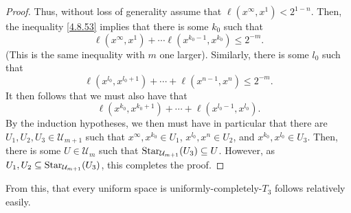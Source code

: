 \begin{thm}
\begin{savenotes}
\begin{proof}
Thus, without loss of generality assume that $\ell (x^\infty,x^1)<2^{1-n}$.  Then, the inequality \eqref{4.8.53} implies that there is some $k_0$ such that
\begin{equation}
\ell (x^\infty,x^1)+\cdots \ell (x^{k_0-1},x^{k_0})\leq 2^{-m}.
\end{equation}
(This is the same inequality with $m$ one larger).  Similarly, there is some $l_0$ such that
\begin{equation}
\ell (x^{l_0},x^{l_0+1})+\cdots +\ell (x^{n-1},x^n)\leq 2^{-m}.
\end{equation}
It then follows that we must also have that
\begin{equation}
\ell (x^{k_0},x^{k_0+1})+\cdots +\ell (x^{l_0-1},x^{l_0}).
\end{equation}
By the induction hypotheses, we then must have in particular that there are $U_1,U_2,U_3\in \mathcal{U}_{m+1}$ such that $x^\infty,x^{k_0}\in U_1$, $x^{l_0},x^n\in U_2$, and $x^{k_0},x^{l_0}\in U_3$.  Then, there is some $U\in \mathcal{U}_m$ such that $\operatorname{Star} _{\mathcal{U}_{m+1}}(U_3)\subseteq U$.  However, as $U_1,U_2\subseteq \operatorname{Star} _{\mathcal{U}_{m+1}}(U_3)$, this completes the proof.
\end{proof}
\end{savenotes}
\end{thm}
From this, that every uniform space is uniformly-completely-$T_3$ follows relatively easily.
